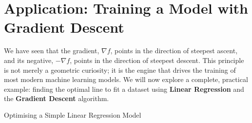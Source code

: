 \section{Application: Training a Model with Gradient Descent}

We have seen that the gradient, \(\nabla f\), points in the direction of steepest ascent, and its negative, \(-\nabla f\), points in the direction of steepest descent. This principle is not merely a geometric curiosity; it is the engine that drives the training of most modern machine learning models. We will now explore a complete, practical example: finding the optimal line to fit a dataset using \textbf{Linear Regression} and the \textbf{Gradient Descent} algorithm.

\begin{example}
    Optimising a Simple Linear Regression Model
\end{example}

